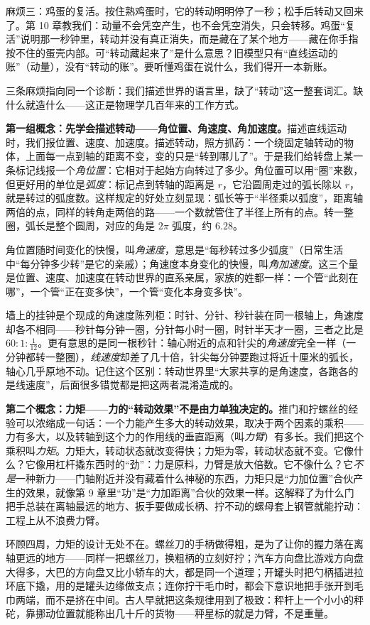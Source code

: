麻烦三：鸡蛋的复活。按住熟鸡蛋时，它的转动明明停了一秒；松手后转动又回来了。第 10 章教我们：动量不会凭空产生，也不会凭空消失，只会转移。鸡蛋“复活”说明那一秒钟里，转动并没有真正消失，而是藏在了某个地方——藏在你手指按不住的蛋壳内部。可“转动藏起来了”是什么意思？旧模型只有“直线运动的账”（动量），没有“转动的账”。要听懂鸡蛋在说什么，我们得开一本新账。

三条麻烦指向同一个诊断：我们描述世界的语言里，缺了“转动”这一整套词汇。缺什么就造什么——这正是物理学几百年来的工作方式。


\begin{mainline}
\textbf{第一组概念：先学会描述转动——角位置、角速度、角加速度。}描述直线运动时，我们报位置、速度、加速度。描述转动，照方抓药：一个绕固定轴转动的物体，上面每一点到轴的距离不变，变的只是“转到哪儿了”。于是我们给转盘上某一条标记线报一个\emph{角位置}：它相对于起始方向转过了多少。角位置可以用“圈”来数，但更好用的单位是\emph{弧度}：标记点到转轴的距离是 \(r\)，它沿圆周走过的弧长除以 \(r\)，就是转过的弧度数。这样规定的好处立刻显现：弧长等于“半径乘以弧度”，距离轴两倍的点，同样的转角走两倍的路——一个数就管住了半径上所有的点。转一整圈，弧长是整个圆周，对应的角是 \(2\pi\) 弧度，约 \(6.28\)。

角位置随时间变化的快慢，叫\emph{角速度}，意思是“每秒转过多少弧度”（日常生活中“每分钟多少转”是它的亲戚）；角速度本身变化的快慢，叫\emph{角加速度}。这三个量是位置、速度、加速度在转动世界的直系亲属，家族的姓都一样：一个管“此刻在哪”，一个管“正在变多快”，一个管“变化本身变多快”。

墙上的挂钟是个现成的角速度陈列柜：时针、分针、秒针装在同一根轴上，角速度却各不相同——秒针每分钟一圈，分针每小时一圈，时针半天才一圈，三者之比是 \(60:1:\tfrac1{12}\)。更有意思的是同一根秒针：轴心附近的点和针尖的\emph{角速度}完全一样（一分钟都转一整圈），\emph{线速度}却差了几十倍，针尖每分钟要跑过将近十厘米的弧长，轴心几乎原地不动。记住这个区别：转动世界里“大家共享的是角速度，各跑各的是线速度”，后面很多错觉都是把这两者混淆造成的。

\textbf{第二个概念：力矩——力的“转动效果”不是由力单独决定的。}推门和拧螺丝的经验可以浓缩成一句话：一个力能产生多大的转动效果，取决于两个因素的乘积——力有多大，以及转轴到这个力的作用线的垂直距离（叫\emph{力臂}）有多长。我们把这个乘积叫\emph{力矩}。力矩大，转动状态就改变得快；力矩为零，转动状态就不变。它像什么？它像用杠杆撬东西时的“劲”：力是原料，力臂是放大倍数。它不像什么？它\emph{不是}一种新力——门轴附近并没有藏着什么神秘的东西，力矩只是“力加位置”合伙产生的效果，就像第 9 章里“功”是“力加距离”合伙的效果一样。这解释了为什么门把手总装在离轴最远的地方、扳手要做成长柄、拧不动的螺母套上钢管就能拧动：工程上从不浪费力臂。

环顾四周，力矩的设计无处不在。螺丝刀的手柄做得粗，是为了让你的握力落在离轴更远的地方——同样一把螺丝刀，换粗柄的立刻好拧；汽车方向盘比游戏方向盘大得多，大巴的方向盘又比小轿车的大，都是同一个道理；开罐头时把勺柄插进拉环底下撬，用的是罐头边缘做支点；连你拧干毛巾时，都会下意识地把手张开到毛巾两端，而不是挤在中间。古人早就把这条规律用到了极致：秤杆上一个小小的秤砣，靠挪动位置就能称出几十斤的货物——秤星标的就是力臂，不是重量。
\end{mainline}


